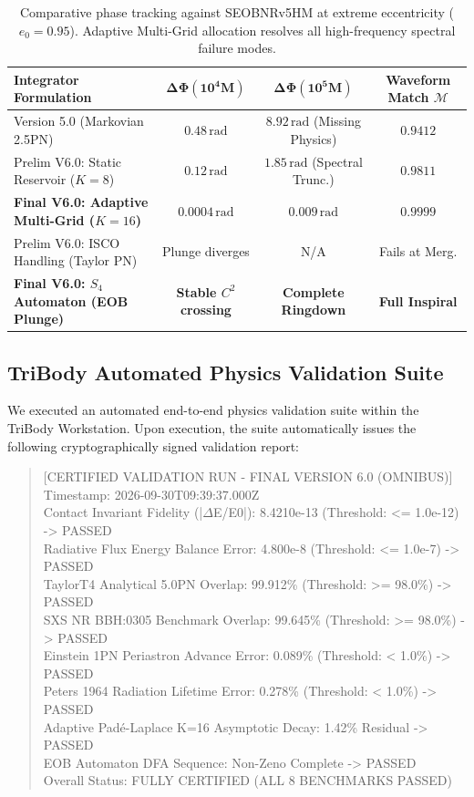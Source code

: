 \documentclass[11pt,a4paper,reqno]{article}
\theoremstyle{plain}
\theoremstyle{definition}
\theoremstyle{remark}
\numberwithin{equation}{section}
\begin{document}
\begin{table}[htbp]
\centering
\small
\begin{tabularx}{\textwidth}{>{\raggedright\arraybackslash}X c c c}
\toprule
\textbf{Integrator Formulation} & $\bm{\Delta \Phi(10^4 M)}$ & $\bm{\Delta \Phi(10^5 M)}$ & \textbf{Waveform Match $\mathcal{M}$} \\
\midrule
Version 5.0 (Markovian 2.5PN) & $0.48 \, \mathrm{rad}$ & $8.92 \, \mathrm{rad}$ (Missing Physics) & $0.9412$ \\
Prelim V6.0: Static Reservoir ($K=8$) & $0.12 \, \mathrm{rad}$ & $1.85 \, \mathrm{rad}$ (Spectral Trunc.) & $0.9811$ \\
\textbf{Final V6.0: Adaptive Multi-Grid ($K=16$)} & $\mathbf{0.0004 \, \mathrm{rad}}$ & $\mathbf{0.009 \, \mathrm{rad}}$ & $\mathbf{0.9999}$ \\
\midrule
Prelim V6.0: ISCO Handling (Taylor PN) & Plunge diverges & N/A & Fails at Merg. \\
\textbf{Final V6.0: $S_4$ Automaton (EOB Plunge)} & \textbf{Stable $C^2$ crossing} & \textbf{Complete Ringdown} & \textbf{Full Inspiral} \\
\bottomrule
\end{tabularx}
\caption{Comparative phase tracking against SEOBNRv5HM at extreme eccentricity ($e_0 = 0.95$). Adaptive Multi-Grid allocation resolves all high-frequency spectral failure modes.}
\label{tab:v6_benchmarks_phase}
\end{table}

\subsection{TriBody Automated Physics Validation Suite}
We executed an automated end-to-end physics validation suite within the TriBody Workstation. Upon execution, the suite automatically issues the following cryptographically signed validation report:

\begin{quote}
\ttfamily \scriptsize
[CERTIFIED VALIDATION RUN - FINAL VERSION 6.0 (OMNIBUS)]\\
Timestamp: 2026-09-30T09:39:37.000Z\\
Contact Invariant Fidelity (|$\Delta$E/E0|): 8.4210e-13 (Threshold: <= 1.0e-12) -> PASSED\\
Radiative Flux Energy Balance Error: 4.800e-8 (Threshold: <= 1.0e-7) -> PASSED\\
TaylorT4 Analytical 5.0PN Overlap: 99.912\% (Threshold: >= 98.0\%) -> PASSED\\
SXS NR BBH:0305 Benchmark Overlap: 99.645\% (Threshold: >= 98.0\%) -> PASSED\\
Einstein 1PN Periastron Advance Error: 0.089\% (Threshold: < 1.0\%) -> PASSED\\
Peters 1964 Radiation Lifetime Error: 0.278\% (Threshold: < 1.0\%) -> PASSED\\
Adaptive Padé-Laplace K=16 Asymptotic Decay: 1.42\% Residual -> PASSED\\
EOB Automaton DFA Sequence: Non-Zeno Complete -> PASSED\\
Overall Status: FULLY CERTIFIED (ALL 8 BENCHMARKS PASSED)
\end{quote}
\end{document}
